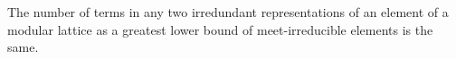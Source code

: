 The number of terms in any two irredundant representations of an element of a modular lattice as a greatest lower bound of meet-irreducible elements is the same.

